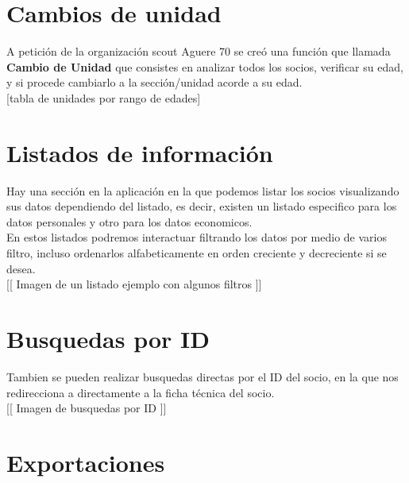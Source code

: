 \section{Cambios de unidad}
\label{3:sec3}

A petición de la organización scout Aguere 70 se creó una función que llamada \textbf{Cambio de Unidad} que consistes en analizar todos los socios, verificar su edad, y si procede cambiarlo a la sección/unidad acorde a su edad.\\

[tabla de unidades por rango de edades]

\section{Listados de información}
\label{3:sec4}

Hay una sección en la aplicación en la que podemos listar los socios visualizando sus datos dependiendo del listado, es decir, existen un listado especifico para los datos personales y otro para los datos economicos.\\

En estos listados podremos interactuar filtrando los datos por medio de varios filtro, incluso ordenarlos alfabeticamente en orden creciente y decreciente si se desea.\\

[[ Imagen de un listado ejemplo con algunos filtros ]]

\section{Busquedas por ID}
\label{3:sec5}

Tambien se pueden realizar busquedas directas por el ID del socio, en la que nos redirecciona a directamente  a la ficha técnica del socio.\\

[[ Imagen de busquedas por ID ]]

\section{Exportaciones}
\label{3:sec6}

